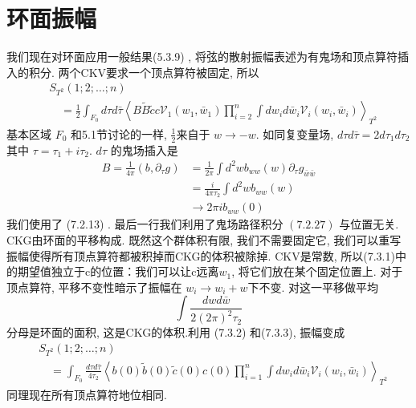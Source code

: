 \section{环面振幅}%
我们现在对环面应用一般结果(5.3.9) , 将弦的散射振幅表述为有鬼场和顶点算符插入的积分. 两个CKV要求一个顶点算符被固定, 所以
\begin{equation}
	\begin{aligned}
		&S_{T^{2}}(1 ; 2 ; \ldots ; n) \\
		&\quad=\frac{1}{2} \int_{F_{0}} d \tau d \bar{\tau}\left\langle B \tilde{B} \tilde{c} c \mathscr{V}_{1}\left(w_{1}, \bar{w}_{1}\right) \prod_{i=2}^{n} \int d w_{i} d \bar{w}_{i} \mathscr{V}_{i}\left(w_{i}, \bar{w}_{i}\right)\right\rangle_{T^{2}}
	\end{aligned}
\end{equation}
基本区域 $F_{0}$ 和5.1节讨论的一样,  $\frac{1}{2}$来自于 $w \rightarrow-w$. 如同复变量场, $d \tau d \bar{\tau}=2 d \tau_{1} d \tau_{2}$ 其中 $\tau=\tau_{1}+i \tau_{2}$.  $d \tau$ 的鬼场插入是
\begin{equation}
	\begin{aligned}
		B=\frac{1}{4 \pi}\left(b, \partial_{\tau} g\right) &=\frac{1}{2 \pi} \int d^{2} w b_{w w}(w) \partial_{\tau} g_{\bar{w} \bar{w}} \\
		&=\frac{i}{4 \pi \tau_{2}} \int d^{2} w b_{w w}(w) \\
		& \rightarrow 2 \pi i b_{w w}(0)
	\end{aligned}
\end{equation}
我们使用了 (7.2.13) . 最后一行我们利用了鬼场路径积分 $(7.2 .27)$ 与位置无关. \\
CKG由环面的平移构成. 既然这个群体积有限, 我们不需要固定它, 我们可以重写振幅使得所有顶点算符都被积掉而CKG的体积被除掉. CKV是常数, 所以(7.3.1)中的期望值独立于c的位置：我们可以让c远离$w_{1}$, 将它们放在某个固定位置上. 对于顶点算符, 平移不变性暗示了振幅在 $w_{i} \rightarrow w_{i}+w$下不变. 对这一平移做平均
\begin{equation}
	\int \frac{d w d \bar{w}}{2(2 \pi)^{2} \tau_{2}}
\end{equation}
分母是环面的面积, 这是CKG的体积.利用 (7.3.2) 和(7.3.3), 振幅变成
\begin{equation}
	\begin{aligned}
		&S_{T^{2}}(1 ; 2 ; \ldots ; n) \\
		&\quad=\int_{F_{0}} \frac{d \tau d \bar{\tau}}{4 \tau_{2}}\left\langle b(0) \tilde{b}(0) \tilde{c}(0) c(0) \prod_{i=1}^{n} \int d w_{i} d \bar{w}_{i} \mathscr{V}_{i}\left(w_{i}, \bar{w}_{i}\right)\right\rangle_{T^{2}}
	\end{aligned}
\end{equation}
同理现在所有顶点算符地位相同.\\

